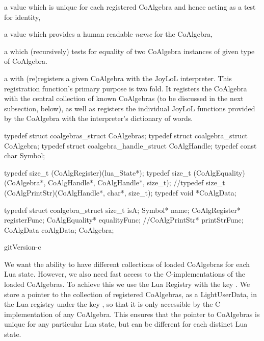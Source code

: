 \startitemize

\item a  value which is unique for each registered CoAlgebra 
and hence acting as a test for identity, 

\item a  value which provides a human readable \emph{name} 
for the CoAlgebra, 

\item a  which (recursively) tests for equality of two 
CoAlgebra instances of given type of CoAlgebra.

\item a  with (re)registers a given CoAlgebra with the 
JoyLoL interpreter. This registration function's primary purpose is two 
fold. It registers the CoAlgebra with the central collection of known 
CoAlgebras (to be discussed in the next subsection, below), as well as 
registers the individual JoyLoL functions provided by the CoAlgebra with 
the interpreter's dictionary of words. 

\stopitemize

\startCHeader
typedef struct coalgebras_struct        CoAlgebras;
typedef struct coalgebra_struct         CoAlgebra;
typedef struct coalgebra_handle_struct  CoAlgHandle;
typedef const char Symbol;

typedef size_t (CoAlgRegister)(lua_State*);
typedef size_t (CoAlgEquality)(CoAlgebra*,
                               CoAlgHandle*,
                               CoAlgHandle*,
                               size_t);
//typedef size_t (CoAlgPrintStr)(CoAlgHandle*, char*, size_t);
typedef void *CoAlgData;

typedef struct coalgebra_struct {
  size_t          isA;
  Symbol*         name;
  CoAlgRegister*  registerFunc;
  CoAlgEquality*  equalityFunc;
  //CoAlgPrintStr*  printStrFunc;
  CoAlgData       coAlgData;
} CoAlgebra;
\stopCHeader

\component gitVersion-c


We want the ability to have different collections of loaded CoAlgebras for 
each Lua state. However, we also need fast access to the C-implementations 
of the loaded CoAlgebras. To achieve this we use the Lua Registry with the 
 key . We store a pointer to the 
collection of registered CoAlgebras, as a LightUserData, in the Lua 
registry under the key , so that it is only accessible 
by the C implementation of any CoAlgebra. This ensures that the pointer to 
CoAlgebras is unique for any particular Lua state, but can be different 
for each distinct Lua state. 

